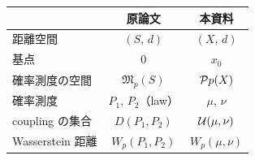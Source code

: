 \begin{center}
\renewcommand{\arraystretch}{1.3}
\begin{tabular}{lcc}
  \hline
  & \textbf{原論文} & \textbf{本資料} \\
  \hline
  距離空間         & $(S,\,d)$                      & $(X,\,d)$ \\
  基点             & $0$                            & $x_0$ \\
  確率測度の空間   & $\mathfrak{M}_p(S)$            & $\mathcal{P}{p}(X)$ \\
  確率測度         & $P_1,\,P_2$（law）             & $\mu,\,\nu$ \\
  coupling の集合  & $D(P_1,P_2)$                   & $\mathcal{U}(\mu,\nu)$ \\
  Wasserstein 距離 & $W_p(P_1,P_2)$                 & $W_p(\mu,\nu)$ \\
  \hline
\end{tabular}
\end{center}

